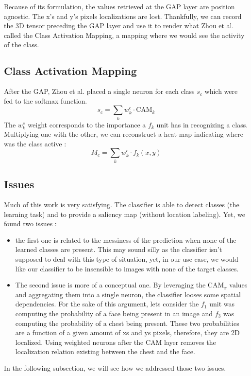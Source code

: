 			Because of its formulation, the values retrieved at the GAP layer are position agnostic. The x's and y's pixels localizations are lost. Thankfully, we can record the 3D tensor preceding the GAP layer and use it to render what Zhou et al. called the Class Activation Mapping, a mapping where we would see the activity of the class.

		\subsection{Class Activation Mapping}
		\label{sub:class_activation_mapping}
			After the GAP, Zhou et al. placed a single neuron for each class $s_c$ which were fed to the softmax function. 
			\begin{equation}
				s_c = \sum_k w_k^c \cdot \text{CAM}_k
			\end{equation}
			The $w_k^c$ weight corresponds to the importance a $f_k$ unit has in recognizing a class. Multiplying one with the other, we can reconstruct a heat-map indicating where was the class active :
			\begin{equation}
				M_c = \sum_k w_k^c \cdot f_k(x,y)
			\end{equation}

		\subsection{Issues}
		\label{sub:issues}
			Much of this work is very satisfying. The classifier is able to detect classes (the learning task) and to provide a saliency map (without location labeling). Yet, we found two issues : 
			\begin{itemize}
				\item the first one is related to the messiness of the prediction when none of the learned classes are present. This may sound silly as the classifier isn't supposed to deal with this type of situation, yet, in our use case, we would like our classifier to be insensible to images with none of the target classes. 
				\item The second issue is more of a conceptual one. By leveraging the $\text{CAM}_x$ values and aggregating them into a single neuron, the classifier looses some spatial dependencies. 
				For the sake of this argument, lets consider the $f_1$ unit was computing the probability of a face being present in an image and $f_3$ was computing the probability of a chest being present. These two probabilities are a function of a given amount of xs and ys pixels, therefore, they are 2D localized. Using weighted neurons after the CAM layer removes the localization relation existing between the chest and the face.
			\end{itemize}
			In the following subsection, we will see how we addressed those two issues.

